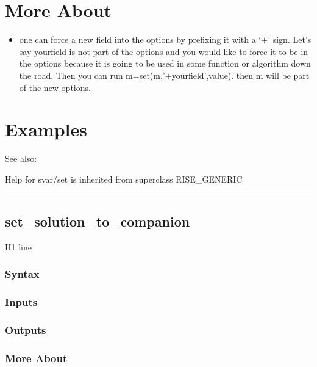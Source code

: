 \documentclass[letterpaper,10pt,english]{sphinxmanual}
\begin{document}
\section{More About}
\label{classes/models/@svar/svar:id102}\begin{itemize}
\item {} 
one can force a new field into the options by prefixing it with a `+'
sign. Let's say yourfield is not part of the options and you would like
to force it to be in the options because it is going to be used in some
function or algorithm down the road. Then you can run
m=set(m,'+yourfield',value). then m will be part of the new options.

\end{itemize}


\section{Examples}
\label{classes/models/@svar/svar:id103}
See also:

Help for svar/set is inherited from superclass RISE\_GENERIC


\bigskip\hrule{}\bigskip



\subsection{set\_solution\_to\_companion}
\label{classes/models/@svar/svar:id104}\label{classes/models/@svar/svar:set-solution-to-companion}
H1 line


\subsubsection{Syntax}
\label{classes/models/@svar/svar:id105}

\subsubsection{Inputs}
\label{classes/models/@svar/svar:id106}

\subsubsection{Outputs}
\label{classes/models/@svar/svar:id107}

\subsubsection{More About}
\label{classes/models/@svar/svar:id108}
\end{document}
